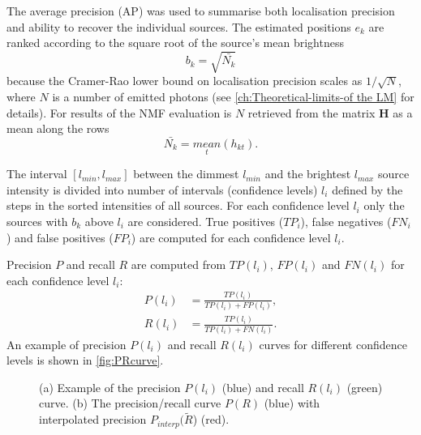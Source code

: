 The average precision (AP) \cite{Salton1986,Everingham2009} was used to summarise both localisation precision and ability to recover the individual sources. The estimated positions $e_k$ are ranked according to the square root of the source's mean brightness
%
\begin{equation}
	b_k=\sqrt{\bar{N_k}}
\end{equation}
%
because the Cramer-Rao lower bound on localisation precision scales as $1/\sqrt{N}$, where $N$ is a number of emitted photons (see \autoref{ch:Theoretical-limits-of the LM} for details). For results of the NMF evaluation is $N$ retrieved from the matrix $\bm{H}$ as a mean along the rows
%
\begin{equation}
	\bar{N_k}=\underset{t}{\unit{mean}}(h_{kt}).
\end{equation}

The interval $[l_{min},l_{max}]$ between the dimmest $l_{min}$ and the brightest $l_{max}$ source intensity is divided into number of intervals (confidence levels) $l_{i}$ defined by the steps in the sorted intensities of all sources. For each confidence level $l_i$ only the sources with $b_k$ above $l_i$ are considered. True positives ($\unit{TP}_{i}$), false negatives ($\unit{FN}_{i}$) and false positives ($\unit{FP}_{i}$) are computed for each confidence level $l_{i}$.

Precision $P$ and recall $R$ are computed from $\unit{TP}(l_{i})$, $\unit{FP}(l_{i})$ and $\unit{FN}(l_{i})$ for each confidence level $l_i$:
%
\begin{align} \label{eq:TP,FN} 
	P(l_i)& = \frac{\unit{TP}(l_i)}{\unit{TP}(l_i)+\unit{FP}(l_i)},\\
	R(l_i)& = \frac{\unit{TP}(l_i)}{\unit{TP}(l_i)+\unit{FN}(l_i)}.
\end{align}
%
An example of precision $P(l_{i})$ and recall $R(l_{i})$ curves for different confidence levels is shown in \autoref{fig:PRcurve}\aaa. 
%
\begin{figure}[!h]
	\newcommand{\widthfig}{.5\textwidth}
	\newcommand{\sizefig}{.4}
	\centering
	\caption{(a) Example of the precision $P(l_{i})$ (blue) and recall $R(l_{i})$ (green) curve. (b) The precision/recall curve $P(R)$ (blue) with interpolated precision $P_{interp}(\tilde{R}$) (red).}
	\label{fig:PRcurve}
\end{figure}

